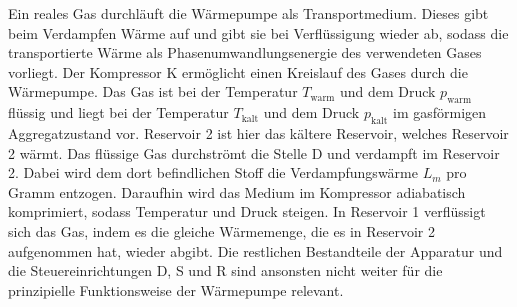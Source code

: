 Ein reales Gas durchläuft die Wärmepumpe als Transportmedium. Dieses gibt beim Verdampfen
Wärme auf und gibt sie bei Verflüssigung wieder ab, sodass die transportierte Wärme
als Phasenumwandlungsenergie des verwendeten Gases vorliegt. Der Kompressor K ermöglicht
einen Kreislauf des Gases durch die Wärmepumpe. Das Gas ist bei der Temperatur $T_\text{warm}$
und dem Druck $p_\text{warm}$ flüssig und liegt bei der Temperatur $T_\text{kalt}$ und dem
Druck $p_\text{kalt}$ im gasförmigen Aggregatzustand vor. Reservoir 2 ist hier das
kältere Reservoir, welches Reservoir 2 wärmt. Das flüssige Gas durchströmt die Stelle D
und verdampft im Reservoir 2. Dabei wird dem dort befindlichen Stoff die Verdampfungswärme
$L_m$ pro Gramm entzogen. Daraufhin wird das Medium im Kompressor adiabatisch komprimiert,
sodass Temperatur und Druck steigen. In Reservoir 1 verflüssigt sich das Gas, indem es
die gleiche Wärmemenge, die es in Reservoir 2 aufgenommen hat, wieder abgibt.
Die restlichen Bestandteile der Apparatur und die Steuereinrichtungen D, S und R sind
ansonsten nicht weiter für die prinzipielle Funktionsweise der Wärmepumpe relevant.

